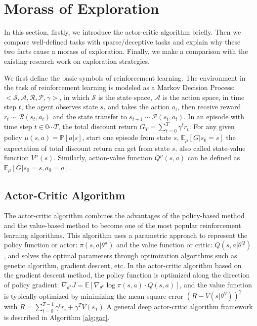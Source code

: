 \section{Morass of Exploration}
In this section, firstly, we introduce the actor-critic algorithm briefly. Then we compare well-defined tasks with sparse/deceptive tasks and explain why these two facts cause a morass of exploration. Finally, we make a comparison with the existing research work on exploration strategies.

We first define the basic symbols of reinforcement learning. The environment in the task of reinforcement learning is modeled as a Markov Decision Process: $<\mathcal{S},\mathcal{A},\mathcal{R},\mathcal{P},\gamma>$, in which $\mathcal{S}$ is the state space, $\mathcal{A}$ is the action space, in time step $t$, the agent observes state $s_t$ and takes the action $a_t$, then receive reward $r_t \sim \mathcal{R}(s_t,a_t)$ and the state transfer to $s_{t+1}\sim \mathcal{P}(s_t,a_t)$. In an episode with time step $t \in {0 \cdots T}$, the total discount return $G_T = \sum_{t=0}^{T}\gamma^t r_t$. For any given policy $\mu(s,a) = \mathbb{P}[a|s]$,  start one episode from state $s$, $\mathbb{E}_{\mu}[G|s_0=s]$ the expectation of total discount return can get from state $s$, also called state-value function $V^{\mu}(s)$. Similarly, action-value function $Q^{\mu}(s,a)$ can be defined as $\mathbb{E}_{\mu}[G|s_0=s,a_0=a]$.

\subsection{Actor-Critic Algorithm}
The actor-critic algorithm combines the advantages of the policy-based method and the value-based method to become one of the most popular reinforcement learning algorithms. This algorithm uses a parametric approach to represent the policy function or actor: $\pi(s,a|\theta^{\pi})$ and the value function or critic: $Q(s, a|\theta^{Q})$, and solves the optimal parameters through optimization algorithms such as genetic algorithm, gradient descent, etc. In the actor-critic algorithm based on the gradient descent method, the policy function is optimized along the direction of policy gradient: $\nabla_{\theta^{\pi}} J = \mathbb{E}[\nabla_{\theta^{\pi}}\log \pi(s,a)\cdot Q(s,a)]$, and the value function is typically optimized by minimizing the mean square error $(R-V(s|\theta^V))^2$ with $R = \sum_{t=0}^{T-1}\gamma^t r_i +\gamma^TV(s_T)$  A general deep actor-critic algorithm framework is described in Algorithm \ref{alg:gac}.

